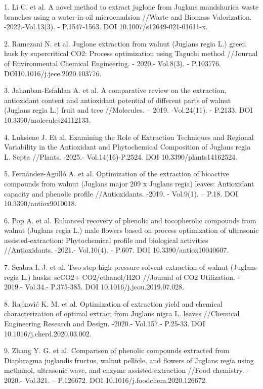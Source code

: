 \begin{refs}
1. Li C. et al. A novel method to extract juglone from Juglans
mandshurica waste branches using a water-in-oil microemulsion //Waste
and Biomass Valorization. -2022.-Vol.13(3). - P.1547-1563. DOI
10.1007/s12649-021-01611-x.

2. Ramezani N. et al. Juglone extraction from walnut (Juglans regia L.)
green husk by supercritical CO2: Process optimization using Taguchi
method //Journal of Environmental Chemical Engineering. - 2020.-
Vol.8(3). - P.103776. DOI10.1016/j.jece.2020.103776.

3. Jahanban-Esfahlan A. et al. A comparative review on the extraction,
antioxidant content and antioxidant potential of different parts of
walnut (Juglans regia L.) fruit and tree //Molecules. --
2019. -Vol.24(11). - P.2133. DOI 10.3390/molecules24112133.

4. Luksiene J. Et al. Examining the Role of Extraction Techniques and
Regional Variability in the Antioxidant and Phytochemical Composition of
Juglans regia L. Septa //Plants. -2025.- Vol.14(16)-P.2524. DOI
10.3390/plants14162524.

5. Fernández-Agulló A. et al. Optimization of the extraction of
bioactive compounds from walnut (Juglans major 209 x Juglans regia)
leaves: Antioxidant capacity and phenolic profile //Antioxidants. -2019.
- Vol.9(1). -- P.18. DOI 10.3390/antiox9010018.

6. Pop A. et al. Enhanced recovery of phenolic and tocopherolic
compounds from walnut (Juglans regia L.) male flowers based on process
optimization of ultrasonic assisted-extraction: Phytochemical profile
and biological activities //Antioxidants. -2021.- Vol.10(4). - P.607.
DOI 10.3390/antiox10040607.

7. Seabra I. J. et al. Two-step high pressure solvent extraction of
walnut (Juglans regia L.) husks: scCO2+ CO2/ethanol/H2O //Journal of CO2
Utilization. - 2019.- Vol.34.- P.375-385. DOI
10.1016/j.jcou.2019.07.028.

8. Rajković K. M. et al. Optimization of extraction yield and chemical
characterization of optimal extract from Juglans nigra L. leaves
//Chemical Engineering Research and Design. -2020.- Vol.157.- P.25-33.
DOI 10.1016/j.cherd.2020.03.002.

9. Zhang Y. G. et al. Comparison of phenolic compounds extracted from
Diaphragma juglandis fructus, walnut pellicle, and flowers of Juglans
regia using methanol, ultrasonic wave, and enzyme assisted-extraction
//Food chemistry. - 2020.- Vol.321. -- P.126672.
DOI 10.1016/j.foodchem.2020.126672.


\end{refs}
